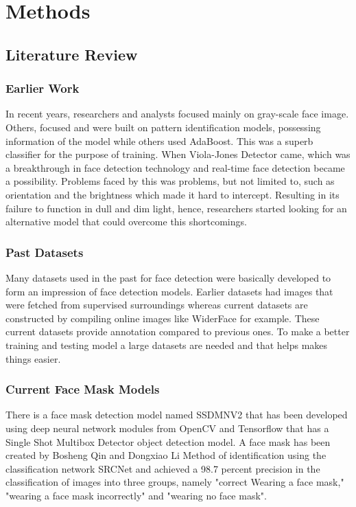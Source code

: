 \chapter{Methods}

\section{Literature Review}
\subsection{Earlier Work}
In recent years, researchers and analysts focused mainly on gray-scale face image. Others, focused and were built on pattern identification models, possessing information of the model while others used AdaBoost. \cite{ojala2002multiresolution} This was a superb classifier for the purpose of training. When Viola-Jones Detector came, which was a breakthrough in face detection technology and real-time face detection became a possibility. Problems faced by this was problems, but not limited to, such as orientation and the brightness which made it hard to intercept. Resulting in its failure to function in dull and dim light, hence, researchers started looking for an alternative model that could overcome this shortcomings.
\subsection{Past Datasets}
Many datasets used in the past for face detection were basically developed to form an impression of face detection models.\cite{nagrath2021ssdmnv2} Earlier datasets had images that were fetched from supervised surroundings whereas current datasets are constructed by compiling online images like WiderFace for example.\cite{yang2016wider}
These current datasets provide annotation compared to previous ones. To make a better training and testing model a large datasets are needed and that helps makes things easier.

\subsection{Current Face Mask Models}
There is a face mask detection model named SSDMNV2 that has been developed using deep neural network modules from OpenCV and Tensorflow that has a Single Shot Multibox Detector object detection model.\cite{nagrath2021ssdmnv2} 
 A face mask has been created by Bosheng Qin and Dongxiao Li 
Method of identification using the classification network SRCNet and achieved a 98.7 percent precision in the classification of images into three groups, namely "correct Wearing a face mask," "wearing a face mask incorrectly" and "wearing no face mask".\cite{qin2020identifying}

